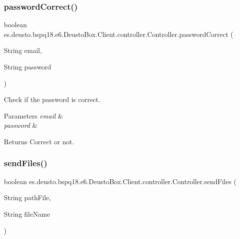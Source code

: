 \subsubsection{\texorpdfstring{password\+Correct()}{passwordCorrect()}}
{\footnotesize\ttfamily boolean es.\+deusto.\+bspq18.\+e6.\+Deusto\+Box.\+Client.\+controller.\+Controller.\+password\+Correct (\begin{DoxyParamCaption}\item[{String}]{email,  }\item[{String}]{password }\end{DoxyParamCaption})}

Check if the password is correct. 
\begin{DoxyParams}{Parameters}
{\em email} & \\
\hline
{\em password} & \\
\hline
\end{DoxyParams}
\begin{DoxyReturn}{Returns}
Correct or not. 
\end{DoxyReturn}
\mbox{\label{classes_1_1deusto_1_1bspq18_1_1e6_1_1_deusto_box_1_1_client_1_1controller_1_1_controller_a5817d0c4e59edbc9b95fd9089e52849e}} 
\subsubsection{\texorpdfstring{send\+Files()}{sendFiles()}}
{\footnotesize\ttfamily boolean es.\+deusto.\+bspq18.\+e6.\+Deusto\+Box.\+Client.\+controller.\+Controller.\+send\+Files (\begin{DoxyParamCaption}\item[{String}]{path\+File,  }\item[{String}]{file\+Name }\end{DoxyParamCaption})}

